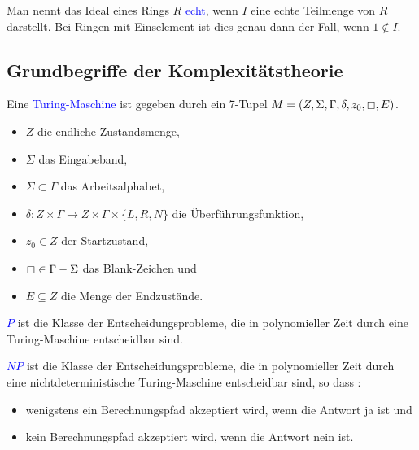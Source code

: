 \begin{definition}
Man nennt das Ideal eines Rings $R$ \textcolor{blue}{echt}, wenn $I$ eine echte Teilmenge von $R$ darstellt. Bei Ringen mit Einselement ist dies genau dann der Fall, wenn $1 \notin I$.  
\end{definition}


\subsection{Grundbegriffe der Komplexitätstheorie}

\begin{definition}
Eine \textcolor{blue}{Turing-Maschine} ist gegeben durch ein 7-Tupel $M =(Z,\Sigma,\Gamma,\delta,z_0,\boxempty,E)$. \cite{Kompl1}
\begin{itemize}
\item $Z$ die endliche Zustandsmenge,
\item $\Sigma$ das Eingabeband,
\item $\Sigma \subset \Gamma$ das Arbeitsalphabet,
\item $\delta: Z \times \Gamma \rightarrow Z \times \Gamma \times \{L,R,N\}$ die Überführungsfunktion,
\item $z_0 \in Z$ der Startzustand,
\item $\boxempty \in \Gamma - \Sigma$ das Blank-Zeichen und 
\item $E \subseteq Z$ die Menge der Endzustände.
\end{itemize}
\end{definition}

\begin{definition}
\textcolor{blue}{$P$} ist die Klasse der Entscheidungsprobleme, die in polynomieller Zeit durch eine Turing-Maschine entscheidbar sind. \cite{Kompl1}
\end{definition}

\begin{definition}
\textcolor{blue}{$NP$} ist die Klasse der Entscheidungsprobleme, die in polynomieller Zeit durch eine nichtdeterministische Turing-Maschine entscheidbar sind, so dass \citep{Kompl1} :
\begin{itemize}
\item wenigstens ein Berechnungspfad akzeptiert wird, wenn die Antwort \glqq ja\grqq{}  ist und
\item kein Berechnungspfad akzeptiert wird, wenn die Antwort \glqq nein\grqq{} ist.
\end{itemize} 
\end{definition}


